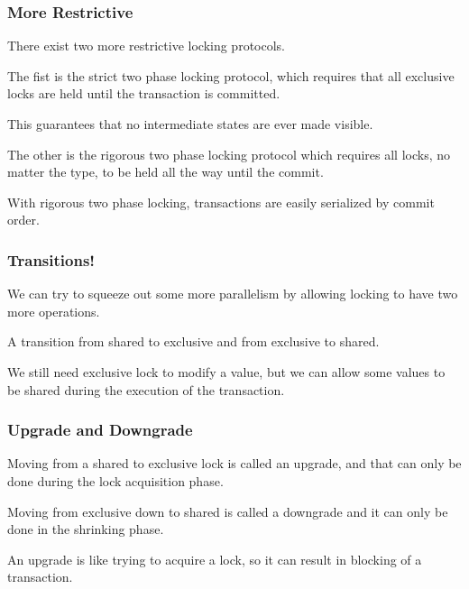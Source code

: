 \begin{frame}
\frametitle{More Restrictive}

There exist two more restrictive locking protocols. 

The fist is the strict two phase locking protocol, which requires that all exclusive locks are held until the transaction is committed. 

This guarantees that no intermediate states are ever made visible. 

The other is the rigorous two phase locking protocol which requires all locks, no matter the type, to be held all the way until the commit. 

With rigorous two phase locking, transactions are easily serialized by commit order.

\end{frame}

\begin{frame}
\frametitle{Transitions!}

We can try to squeeze out some more parallelism by allowing locking to have two more operations. 

A transition from shared to exclusive and from exclusive to shared. 

We still need exclusive lock to modify a value, but we can allow some values to be shared during the execution of the transaction. 


\end{frame}

\begin{frame}
\frametitle{Upgrade and Downgrade}

Moving from a shared to exclusive lock is called an upgrade, and that can only be done during the lock acquisition phase.

 Moving from exclusive down to shared is called a downgrade and it can only be done in the shrinking phase.

An upgrade is like trying to acquire a lock, so it can result in blocking of a transaction.

\end{frame}

